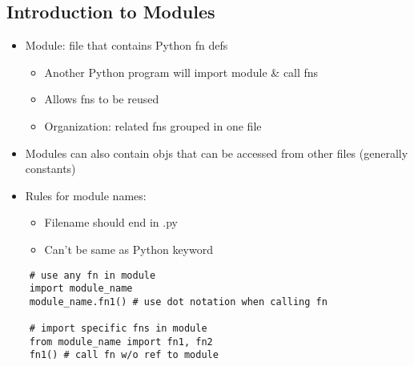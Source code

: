 \documentclass{article}
\begin{document}
\subsection{Introduction to Modules}
    \begin{multicols}{2}
        \begin{itemize}
            \item Module: file that contains Python fn defs
                \begin{itemize}
                    \item Another Python program will import module \& call fns
                    \item Allows fns to be reused
                    \item Organization: related fns grouped in one file
                \end{itemize}
            \item Modules can also contain objs that can be accessed from other files (generally constants)
            \item Rules for module names:
                \begin{itemize}
                    \item Filename should end in .py
                    \item Can't be same as Python keyword
                \end{itemize}
        \end{itemize}
    \end{multicols}
\vspace{-1em}
\begin{lstlisting}
    # use any fn in module
    import module_name
    module_name.fn1() # use dot notation when calling fn
    
    # import specific fns in module
    from module_name import fn1, fn2
    fn1() # call fn w/o ref to module
\end{lstlisting}

\end{document}
